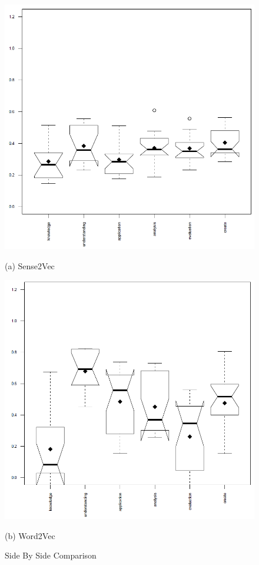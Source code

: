 \begin{figure}[H]
\centering
\begin{minipage}{.5\textwidth}
  \centering
  \includegraphics[width=1\linewidth]{images/s2v_bloom.PNG}
  \caption{(a) Sense2Vec}
  \label{fig:s2v}
\end{minipage}%
\begin{minipage}{.5\textwidth}
  \centering
  \includegraphics[width=1\linewidth]{images/w2v_bloom.PNG}
  \caption{(b) Word2Vec}
  \label{fig:w2v}
\end{minipage}
\caption{Side By Side Comparison}
\label{fig:side_by_side}
\end{figure}

